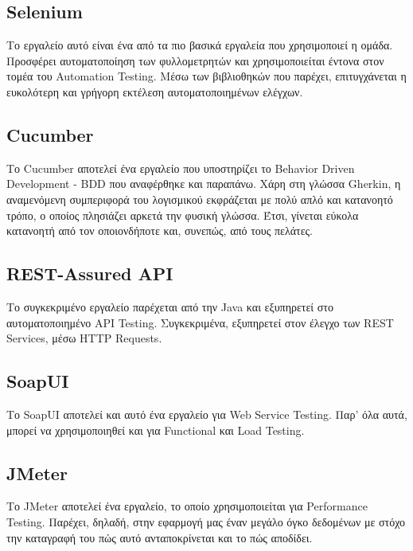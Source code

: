 \subsection*{Selenium}
Το εργαλείο αυτό είναι ένα από τα πιο βασικά εργαλεία που χρησιμοποιεί η ομάδα. Προσφέρει αυτοματοποίηση των φυλλομετρητών και χρησιμοποιείται 
έντονα στον τομέα του Automation Testing. Μέσω των βιβλιοθηκών που παρέχει, επιτυγχάνεται η ευκολότερη και γρήγορη εκτέλεση αυτοματοποιημένων 
ελέγχων.
\subsection*{Cucumber}
Το Cucumber αποτελεί ένα εργαλείο που υποστηρίζει το Behavior Driven Development - BDD που αναφέρθηκε και παραπάνω. Χάρη στη γλώσσα Gherkin, η 
αναμενόμενη συμπεριφορά του λογισμικού εκφράζεται με πολύ απλό και κατανοητό τρόπο, ο οποίος πλησιάζει αρκετά την φυσική γλώσσα. Έτσι, γίνεται 
εύκολα κατανοητή από τον οποιονδήποτε και, συνεπώς, από τους πελάτες.
\subsection*{REST-Assured API}
Το συγκεκριμένο εργαλείο παρέχεται από την Java και εξυπηρετεί στο αυτοματοποιημένο API Testing. Συγκεκριμένα, εξυπηρετεί στον έλεγχο των REST 
Services, μέσω HTTP Requests.
\subsection*{SoapUI}
Το SoapUI αποτελεί και αυτό ένα εργαλείο για Web Service Testing. Παρ' όλα αυτά, μπορεί να χρησιμοποιηθεί και για Functional και Load Testing.
\subsection*{JMeter}
Το JMeter αποτελεί ένα εργαλείο, το οποίο χρησιμοποιείται για Performance Testing. Παρέχει, δηλαδή, στην εφαρμογή μας έναν μεγάλο όγκο 
δεδομένων με στόχο την καταγραφή του πώς αυτό ανταποκρίνεται και το πώς αποδίδει.
